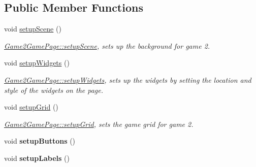 \subsection*{Public Member Functions}
\begin{DoxyCompactItemize}
\item 
\mbox{\label{classGame2GamePage_ab71efdf6cb71c97b5a2238949f0c95b7}} 
void \hyperlink{classGame2GamePage_ab71efdf6cb71c97b5a2238949f0c95b7}{setup\+Scene} ()
\begin{DoxyCompactList}\small\item\em \hyperlink{classGame2GamePage_ab71efdf6cb71c97b5a2238949f0c95b7}{Game2\+Game\+Page\+::setup\+Scene}, sets up the background for game 2. \end{DoxyCompactList}\item 
\mbox{\label{classGame2GamePage_a1ee99123c5036f9fc382bed9265ea7f7}} 
void \hyperlink{classGame2GamePage_a1ee99123c5036f9fc382bed9265ea7f7}{setup\+Widgets} ()
\begin{DoxyCompactList}\small\item\em \hyperlink{classGame2GamePage_a1ee99123c5036f9fc382bed9265ea7f7}{Game2\+Game\+Page\+::setup\+Widgets}, sets up the widgets by setting the location and style of the widgets on the page. \end{DoxyCompactList}\item 
\mbox{\label{classGame2GamePage_ac9ac508ff46692824fb8c5c1825d47e7}} 
void \hyperlink{classGame2GamePage_ac9ac508ff46692824fb8c5c1825d47e7}{setup\+Grid} ()
\begin{DoxyCompactList}\small\item\em \hyperlink{classGame2GamePage_ac9ac508ff46692824fb8c5c1825d47e7}{Game2\+Game\+Page\+::setup\+Grid}, sets the game grid for game 2. \end{DoxyCompactList}\item 
\mbox{\label{classGame2GamePage_aa132359a1cb1018e611df0496f72bca4}} 
void {\bfseries setup\+Buttons} ()
\item 
\mbox{\label{classGame2GamePage_a1a63f89f03dc2ebbd6474640ed6ca27f}} 
void {\bfseries setup\+Labels} ()
\item 
\mbox{\label{classGame2GamePage_a429951c0c6df01a990fb72d3f7d2337c}} 

\end{DoxyCompactItemize}
